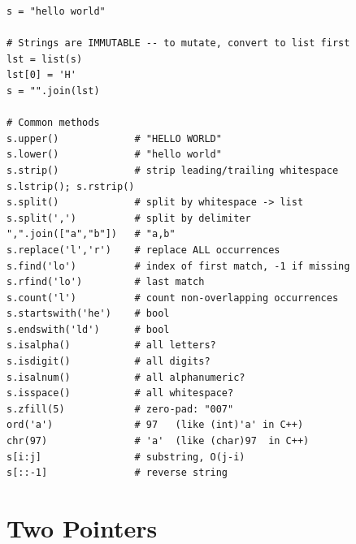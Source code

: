 \documentclass[11pt,a4paper]{report}
\begin{document}
\begin{lstlisting}
s = "hello world"

# Strings are IMMUTABLE -- to mutate, convert to list first
lst = list(s)
lst[0] = 'H'
s = "".join(lst)

# Common methods
s.upper()             # "HELLO WORLD"
s.lower()             # "hello world"
s.strip()             # strip leading/trailing whitespace
s.lstrip(); s.rstrip()
s.split()             # split by whitespace -> list
s.split(',')          # split by delimiter
",".join(["a","b"])   # "a,b"
s.replace('l','r')    # replace ALL occurrences
s.find('lo')          # index of first match, -1 if missing
s.rfind('lo')         # last match
s.count('l')          # count non-overlapping occurrences
s.startswith('he')    # bool
s.endswith('ld')      # bool
s.isalpha()           # all letters?
s.isdigit()           # all digits?
s.isalnum()           # all alphanumeric?
s.isspace()           # all whitespace?
s.zfill(5)            # zero-pad: "007"
ord('a')              # 97   (like (int)'a' in C++)
chr(97)               # 'a'  (like (char)97  in C++)
s[i:j]                # substring, O(j-i)
s[::-1]               # reverse string
\end{lstlisting}

\section{Two Pointers}
\end{document}
